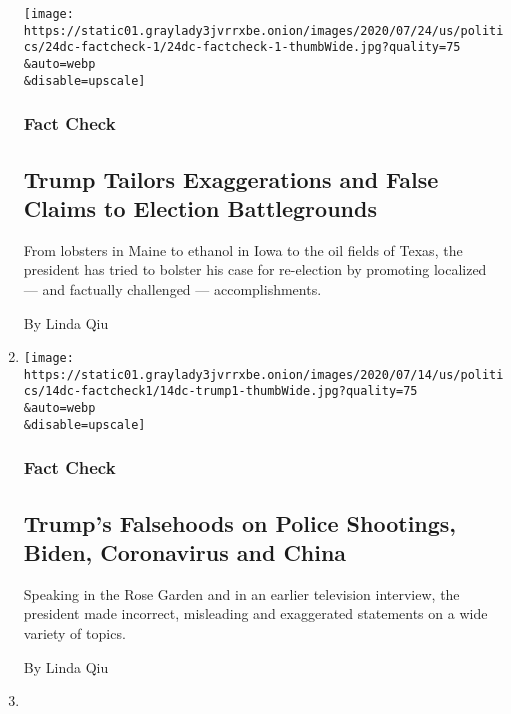 \begin{enumerate}
  \texttt{[image: https://static01.graylady3jvrrxbe.onion/images/2020/07/24/us/politics/24dc-factcheck-1/24dc-factcheck-1-thumbWide.jpg?quality=75\\\&auto=webp\\\&disable=upscale]}

  \hypertarget{fact-check-1}{%
  \subsubsection{Fact Check}\label{fact-check-1}}

  \hypertarget{trump-tailors-exaggerations-and-false-claims-to-election-battlegrounds}{%
  \subsection{Trump Tailors Exaggerations and False Claims to Election
  Battlegrounds}\label{trump-tailors-exaggerations-and-false-claims-to-election-battlegrounds}}

  From lobsters in Maine to ethanol in Iowa to the oil fields of Texas,
  the president has tried to bolster his case for re-election by
  promoting localized --- and factually challenged --- accomplishments.

  By Linda Qiu
\item
  \href{/2020/07/14/us/politics/trump-fact-check-biden-police-coronavirus-china.html}{}

  \texttt{[image: https://static01.graylady3jvrrxbe.onion/images/2020/07/14/us/politics/14dc-factcheck1/14dc-trump1-thumbWide.jpg?quality=75\\\&auto=webp\\\&disable=upscale]}

  \hypertarget{fact-check-2}{%
  \subsubsection{Fact Check}\label{fact-check-2}}

  \hypertarget{trumps-falsehoods-on-police-shootings-biden-coronavirus-and-china}{%
  \subsection{Trump's Falsehoods on Police Shootings, Biden, Coronavirus
  and
  China}\label{trumps-falsehoods-on-police-shootings-biden-coronavirus-and-china}}

  Speaking in the Rose Garden and in an earlier television interview,
  the president made incorrect, misleading and exaggerated statements on
  a wide variety of topics.

  By Linda Qiu
\item
  \href{/2020/07/11/us/politics/fact-checking-biden-on-the-coronavirus-and-his-own-record.html}{}


\end{enumerate}
